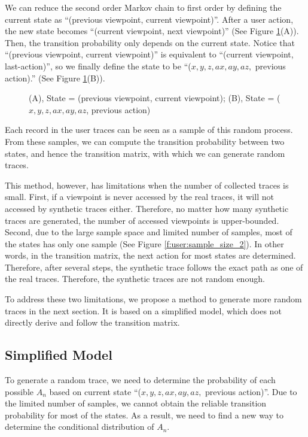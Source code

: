 We can reduce the second order Markov chain to first order by defining the current state as
``(previous viewpoint, current viewpoint)''. After a user action, the new state becomes 
``(current viewpoint, next viewpoint)'' (See Figure \ref{f:user:reduction}(A)). 
Then, the transition probability only depends on the current state.
Notice that ``(previous viewpoint, current viewpoint)'' is equivalent to ``(current viewpoint, last-action)'', 
so we finally define the state to be ``($x, y, z, ax, ay, az,$ previous action).'' 
(See Figure \ref{f:user:reduction}(B)).
\begin{figure}
    \centering
    \caption{(A), State = (previous viewpoint, current viewpoint); (B), State = ($x, y, z, ax, ay, az$, previous action)}
    \label{f:user:reduction}
\end{figure}

Each record in the user traces can be seen as a sample of this random process.
From these samples, we can compute the transition probability between two states, and hence
the transition matrix, with which we can generate random traces.

This method, however, has limitations when the number of collected traces is small. First, if a viewpoint is 
never accessed by the real traces, it will not accessed by synthetic traces either. Therefore, no matter how
many synthetic traces are generated, the number of accessed viewpoints is upper-bounded. 
Second, due to the large sample space and limited number of samples, most of the states has only one sample
(See Figure \ref{f:user:sample_size_2}). 
In other words, in the transition matrix, the next action for most states are determined. 
Therefore, after several steps, the synthetic trace follows the exact path as one of the real traces. 
Therefore, the synthetic traces are not random enough.

To address these two limitations, we propose a method to generate more random traces in the next section.
It is based on a simplified model, which does not directly derive and follow the transition matrix.

\subsection{Simplified Model}
To generate a random trace, we need to determine the probability of each possible $A_n$ based on current
state ``($x,y,z,ax,ay,az,$ previous action)''. Due to the limited number of samples, we cannot obtain the reliable
transition probability for most of the states. As a result, we need to find a new way to determine the 
conditional distribution of $A_n$.

